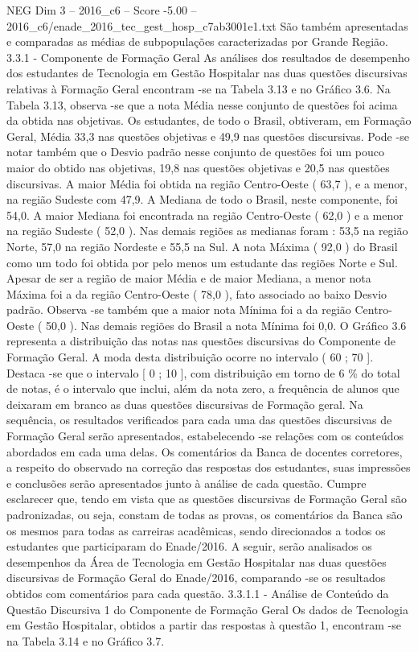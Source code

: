 \begin{textsample}{NEG Dim 3 – 2016\_c6 – Score -5.00 – 2016\_c6/enade\_2016\_tec\_gest\_hosp\_c7ab3001e1.txt}
São também apresentadas e comparadas as médias de subpopulações caracterizadas por Grande Região. 3.3.1 - Componente de Formação Geral As análises dos resultados de desempenho dos estudantes de Tecnologia em Gestão Hospitalar nas duas questões discursivas relativas à Formação Geral encontram -se na Tabela 3.13 e no Gráfico 3.6.
Na Tabela 3.13, observa -se que a nota Média nesse conjunto de questões foi acima da obtida nas objetivas.
Os estudantes, de todo o Brasil, obtiveram, em Formação Geral, Média 33,3 nas questões objetivas e 49,9 nas questões discursivas.
Pode -se notar também que o Desvio padrão nesse conjunto de questões foi um pouco maior do obtido nas objetivas, 19,8 nas questões objetivas e 20,5 nas questões discursivas.
A maior Média foi obtida na região Centro-Oeste ( 63,7 ), e a menor, na região Sudeste com 47,9.
A Mediana de todo o Brasil, neste componente, foi 54,0.
A maior Mediana foi encontrada na região Centro-Oeste ( 62,0 ) e a menor na região Sudeste ( 52,0 ).
Nas demais regiões as medianas foram : 53,5 na região Norte, 57,0 na região Nordeste e 55,5 na Sul.
A nota Máxima ( 92,0 ) do Brasil como um todo foi obtida por pelo menos um estudante das regiões Norte e Sul.
Apesar de ser a região de maior Média e de maior Mediana, a menor nota Máxima foi a da região Centro-Oeste ( 78,0 ), fato associado ao baixo Desvio padrão.
Observa -se também que a maior nota Mínima foi a da região Centro-Oeste ( 50,0 ).
Nas demais regiões do Brasil a nota Mínima foi 0,0.
O Gráfico 3.6 representa a distribuição das notas nas questões discursivas do Componente de Formação Geral.
A moda desta distribuição ocorre no intervalo ( 60 ; 70 ].
Destaca -se que o intervalo [ 0 ; 10 ], com distribuição em torno de 6 \% do total de notas, é o intervalo que inclui, além da nota zero, a frequência de alunos que deixaram em branco as duas questões discursivas de Formação geral.
Na sequência, os resultados verificados para cada uma das questões discursivas de Formação Geral serão apresentados, estabelecendo -se relações com os conteúdos abordados em cada uma delas.
Os comentários da Banca de docentes corretores, a respeito do observado na correção das respostas dos estudantes, suas impressões e conclusões serão apresentados junto à análise de cada questão.
Cumpre esclarecer que, tendo em vista que as questões discursivas de Formação Geral são padronizadas, ou seja, constam de todas as provas, os comentários da Banca são os mesmos para todas as carreiras acadêmicas, sendo direcionados a todos os estudantes que participaram do Enade/2016.
A seguir, serão analisados os desempenhos da Área de Tecnologia em Gestão Hospitalar nas duas questões discursivas de Formação Geral do Enade/2016, comparando -se os resultados obtidos com comentários para cada questão. 3.3.1.1 - Análise de Conteúdo da Questão Discursiva 1 do Componente de Formação Geral Os dados de Tecnologia em Gestão Hospitalar, obtidos a partir das respostas à questão 1, encontram -se na Tabela 3.14 e no Gráfico 3.7.

\end{textsample}
